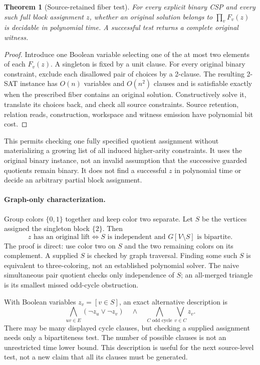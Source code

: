 \documentclass[11pt]{article}
\newtheorem{theorem}{Theorem}
\begin{document}
\begin{theorem}[Source-retained fiber test]\label{thm:fiber}
For every explicit binary CSP and every such full block assignment $z$,
whether an original solution belongs to $\prod_v F_v(z)$ is decidable in
polynomial time. A successful test returns a complete original witness.
\end{theorem}
\begin{proof}
Introduce one Boolean variable selecting one of the at most two elements
of each $F_v(z)$. A singleton is fixed by a unit clause. For every original
binary constraint, exclude each disallowed pair of choices by a 2-clause.
The resulting 2-SAT instance has $O(n)$ variables and $O(n^2)$ clauses and
is satisfiable exactly when the prescribed fiber contains an original
solution. Constructively solve it, translate its choices back, and check
all source constraints. Source retention, relation reads, construction,
workspace and witness emission have polynomial bit cost.
\end{proof}

This permits checking one fully specified quotient assignment without
materializing a growing list of all induced higher-arity constraints. It
uses the original binary instance, not an invalid assumption that the
successive guarded quotients remain binary. It does not find a successful
$z$ in polynomial time or decide an arbitrary partial block assignment.

\paragraph{Graph-only characterization.}
Group colors $\{0,1\}$ together and keep color two separate. Let $S$ be the
vertices assigned the singleton block $\{2\}$. Then
\begin{equation}\label{eq:graphfiber}
 z\text{ has an original lift}
 \iff S\text{ is independent and }G[V\setminus S]\text{ is bipartite}.
\end{equation}
The proof is direct: use color two on $S$ and the two remaining colors on
its complement. A supplied $S$ is checked by graph traversal. Finding some
such $S$ is equivalent to three-coloring, not an established polynomial solver.
The naive simultaneous pair quotient checks only independence of $S$; an
all-merged triangle is its smallest missed odd-cycle obstruction.

With Boolean variables $z_v=[v\in S]$, an exact alternative description is
\[
 \bigwedge_{uv\in E}(\neg z_u\lor\neg z_v)
 \quad\land\quad
 \bigwedge_{C\text{ odd cycle}}\bigvee_{v\in C}z_v.
\]
There may be many displayed cycle clauses, but checking a supplied assignment
needs only a bipartiteness test. The number of possible clauses is not an
unrestricted time lower bound. This description is useful for the next
source-level test, not a new claim that all its clauses must be generated.
\end{document}
